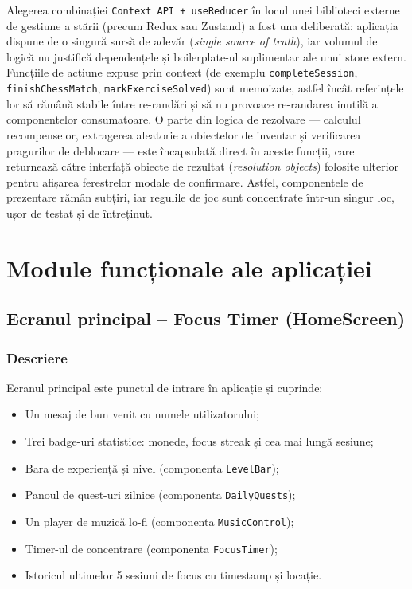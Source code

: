 \documentclass[12pt, a4paper, twoside]{report}
\numberwithin{equation}{section}
\begin{document}
Alegerea combinației \texttt{Context API + useReducer} în locul unei biblioteci externe de
gestiune a stării (precum Redux sau Zustand) a fost una deliberată: aplicația dispune de o
singură sursă de adevăr (\textit{single source of truth}), iar volumul de logică nu
justifică dependențele și boilerplate-ul suplimentar ale unui store extern. Funcțiile de
acțiune expuse prin context (de exemplu \texttt{completeSession}, \texttt{finishChessMatch},
\texttt{markExerciseSolved}) sunt memoizate, astfel încât referințele lor să rămână stabile
între re-randări și să nu provoace re-randarea inutilă a componentelor consumatoare.
O parte din logica de rezolvare — calculul recompenselor, extragerea aleatorie a obiectelor
de inventar și verificarea pragurilor de deblocare — este încapsulată direct în aceste
funcții, care returnează către interfață obiecte de rezultat (\textit{resolution objects})
folosite ulterior pentru afișarea ferestrelor modale de confirmare. Astfel, componentele de
prezentare rămân subțiri, iar regulile de joc sunt concentrate într-un singur loc, ușor de
testat și de întreținut.

\chapter{Module funcționale ale aplicației}

\section{Ecranul principal -- Focus Timer (HomeScreen)}

\subsection{Descriere}

Ecranul principal este punctul de intrare în aplicație și cuprinde:
\begin{itemize}
  \item Un mesaj de bun venit cu numele utilizatorului;
  \item Trei badge-uri statistice: monede, focus streak și cea mai lungă sesiune;
  \item Bara de experiență și nivel (componenta \texttt{LevelBar});
  \item Panoul de quest-uri zilnice (componenta \texttt{DailyQuests});
  \item Un player de muzică lo-fi (componenta \texttt{MusicControl});
  \item Timer-ul de concentrare (componenta \texttt{FocusTimer});
  \item Istoricul ultimelor 5 sesiuni de focus cu timestamp și locație.
\end{itemize}
\end{document}
